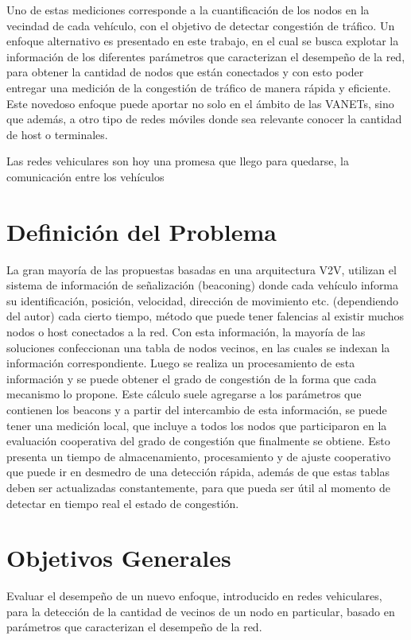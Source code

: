 Uno de estas mediciones corresponde a la cuantificación de los nodos en la vecindad de cada vehículo, con el objetivo de detectar congestión de tráfico. Un enfoque alternativo es presentado en este trabajo, en el cual se busca explotar la información de los diferentes parámetros que caracterizan el desempeño de la red, para obtener la cantidad de nodos que están conectados y con esto poder entregar una medición de la congestión de tráfico de manera rápida y eficiente.
Este novedoso enfoque puede aportar no solo en el ámbito de las VANETs, sino que además, a otro tipo de redes móviles donde sea relevante conocer la cantidad de host o terminales. 

Las redes vehiculares son hoy una promesa que llego para quedarse, la comunicación entre los vehículos

\section{Definición del Problema}
La gran mayoría de las propuestas basadas en una arquitectura V2V, utilizan el sistema de información de señalización (beaconing) donde cada vehículo informa su identificación, posición, velocidad, dirección de movimiento etc. (dependiendo del autor) cada cierto tiempo, método que puede tener falencias al existir muchos nodos o host conectados a la red. Con esta información, la mayoría de las soluciones confeccionan una tabla de nodos vecinos, en las cuales se indexan la información correspondiente. Luego se realiza un procesamiento de esta información y se puede obtener el grado de congestión de la forma que cada mecanismo lo propone. Este cálculo suele agregarse a los parámetros que contienen los beacons  y a partir del intercambio de esta información, se puede tener una medición local, que incluye a todos los nodos que participaron en la evaluación cooperativa del grado de congestión que finalmente se obtiene.  Esto presenta un tiempo de almacenamiento, procesamiento y de ajuste cooperativo que puede ir en desmedro de una detección rápida, además de que estas tablas deben ser actualizadas constantemente, para que pueda ser útil al momento de detectar en tiempo real el estado de congestión.

\section{Objetivos Generales}

Evaluar el desempeño de un nuevo enfoque, introducido en redes vehiculares, para la detección de la cantidad de vecinos de un nodo en particular, basado en parámetros que caracterizan el desempeño de la red.
